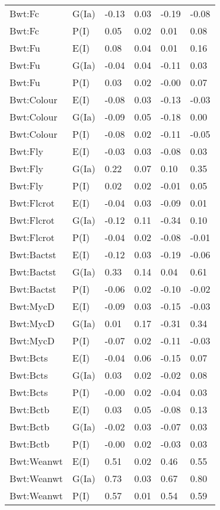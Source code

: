 \begin{center}
\begin{longtable}{|p{1.1in}|p{0.7in}|p{0.7in}|p{0.6in}|p{0.6in}|p{0.6in}|}
  Bwt:Fc & G(Ia) & -0.13 & 0.03 & -0.19 & -0.08 \\ 
  Bwt:Fc & P(I) & 0.05 & 0.02 & 0.01 & 0.08 \\ 
  Bwt:Fu & E(I) & 0.08 & 0.04 & 0.01 & 0.16 \\ 
  Bwt:Fu & G(Ia) & -0.04 & 0.04 & -0.11 & 0.03 \\ 
  Bwt:Fu & P(I) & 0.03 & 0.02 & -0.00 & 0.07 \\ 
  Bwt:Colour & E(I) & -0.08 & 0.03 & -0.13 & -0.03 \\ 
  Bwt:Colour & G(Ia) & -0.09 & 0.05 & -0.18 & 0.00 \\ 
  Bwt:Colour & P(I) & -0.08 & 0.02 & -0.11 & -0.05 \\ 
  Bwt:Fly & E(I) & -0.03 & 0.03 & -0.08 & 0.03 \\ 
  Bwt:Fly & G(Ia) & 0.22 & 0.07 & 0.10 & 0.35 \\ 
  Bwt:Fly & P(I) & 0.02 & 0.02 & -0.01 & 0.05 \\ 
  Bwt:Flcrot & E(I) & -0.04 & 0.03 & -0.09 & 0.01 \\ 
  Bwt:Flcrot & G(Ia) & -0.12 & 0.11 & -0.34 & 0.10 \\ 
  Bwt:Flcrot & P(I) & -0.04 & 0.02 & -0.08 & -0.01 \\ 
  Bwt:Bactst & E(I) & -0.12 & 0.03 & -0.19 & -0.06 \\ 
  Bwt:Bactst & G(Ia) & 0.33 & 0.14 & 0.04 & 0.61 \\ 
  Bwt:Bactst & P(I) & -0.06 & 0.02 & -0.10 & -0.02 \\ 
  Bwt:MycD & E(I) & -0.09 & 0.03 & -0.15 & -0.03 \\ 
  Bwt:MycD & G(Ia) & 0.01 & 0.17 & -0.31 & 0.34 \\ 
  Bwt:MycD & P(I) & -0.07 & 0.02 & -0.11 & -0.03 \\ 
  Bwt:Bcts & E(I) & -0.04 & 0.06 & -0.15 & 0.07 \\ 
  Bwt:Bcts & G(Ia) & 0.03 & 0.02 & -0.02 & 0.08 \\ 
  Bwt:Bcts & P(I) & -0.00 & 0.02 & -0.04 & 0.03 \\ 
  Bwt:Bctb & E(I) & 0.03 & 0.05 & -0.08 & 0.13 \\ 
  Bwt:Bctb & G(Ia) & -0.02 & 0.03 & -0.07 & 0.03 \\ 
  Bwt:Bctb & P(I) & -0.00 & 0.02 & -0.03 & 0.03 \\ 
  Bwt:Weanwt & E(I) & 0.51 & 0.02 & 0.46 & 0.55 \\ 
  Bwt:Weanwt & G(Ia) & 0.73 & 0.03 & 0.67 & 0.80 \\ 
  Bwt:Weanwt & P(I) & 0.57 & 0.01 & 0.54 & 0.59 \\ 

\end{longtable}
\end{center}

